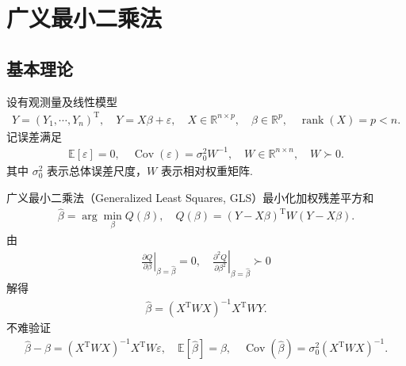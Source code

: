 \chapter{广义最小二乘法}
\section{基本理论}

设有观测量及线性模型
\begin{align*}
	Y=(Y_1,\cdots,Y_n)^\mathrm{T},\quad Y=X\beta+\varepsilon,
	\quad X\in\mathbb{R}^{n\times p},\quad \beta\in\mathbb{R}^p,
	\quad \operatorname{rank}(X)=p<n.
\end{align*}
记误差满足
\begin{align*}
	\mathbb{E}[\varepsilon]=0,
	\quad \operatorname{Cov}(\varepsilon)=\sigma_0^2 W^{-1},
	\quad W\in\mathbb{R}^{n\times n},\quad W\succ0.
\end{align*}
其中 \(\sigma_0^2\) 表示总体误差尺度，\(W\) 表示相对权重矩阵.

广义最小二乘法（Generalized Least Squares, GLS）最小化加权残差平方和
\begin{align*}
	\hat{\beta}=\arg\min_{\beta}Q(\beta),
	\quad Q(\beta)=(Y-X\beta)^\mathrm{T}W(Y-X\beta).
\end{align*}
由
\begin{align*}
	\left.\frac{\partial Q}{\partial\beta}\right|_{\beta=\hat{\beta}}=0,
	\quad \left.\frac{\partial^2 Q}{\partial\beta^2}\right|_{\beta=\hat{\beta}}\succ0
\end{align*}
解得
\begin{align*}
	\hat{\beta}=(X^\mathrm{T}WX)^{-1}X^\mathrm{T}WY.
\end{align*}
不难验证
\begin{align*}
	\hat{\beta}-\beta=(X^\mathrm{T}WX)^{-1}X^\mathrm{T}W\varepsilon,
	\quad \mathbb{E}[\hat{\beta}]=\beta,
	\quad \operatorname{Cov}(\hat{\beta})=\sigma_0^2(X^\mathrm{T}WX)^{-1}.
\end{align*}

